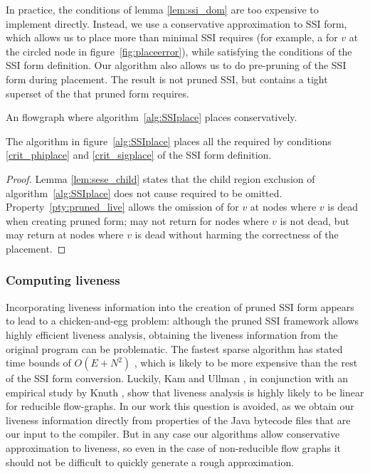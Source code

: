 \documentclass[12pt,titlepage,twoside]{article}
\newcommand*{\figscale}{1.0}
\begin{document}
In practice, the conditions of lemma \ref{lem:ssi_dom} are too expensive
to implement directly.  Instead, we use a conservative approximation
to SSI form, which allows us to place more  than
minimal SSI requires (for example, a \phifunction for $v$ at the
circled node in figure~\ref{fig:placeerror}), while satisfying the
conditions of the SSI form definition.  
Our algorithm also allows us to do pre-pruning of the SSI
form during placement.  The result is not pruned SSI, but contains a
tight superset of the  that pruned form requires.
\begin{myfigure}
\centering\renewcommand*{\figscale}{0.30}
\caption{An flowgraph where algorithm~\ref{alg:SSIplace} places
 conservatively.}\label{fig:placeerror}
\end{myfigure}

\begin{theorem}\label{thm:placeproof}
The algorithm in figure~\ref{alg:SSIplace} places all the
 required by conditions \ref{crit_phiplace} and
\ref{crit_sigplace} of the SSI form definition.
\end{theorem}
\begin{proof}
Lemma \ref{lem:sese_child} states that the child region exclusion of
algorithm~\ref{alg:SSIplace} does not cause required  to
be omitted.  Property~\ref{pty:pruned_live} allows the omission of
 for $v$ at nodes where $v$ is dead when creating
pruned form;  may not return  for nodes
where $v$ is not dead, but may return  at nodes where $v$
is dead without harming the correctness of the \phisigfunction{}
placement.
\end{proof}

\subsubsection{Computing liveness}
Incorporating liveness information into the creation of pruned SSI
form appears to lead to a chicken-and-egg problem: although the pruned
SSI framework allows highly efficient liveness analysis, obtaining the
liveness information from the original program can be problematic.
The fastest sparse algorithm has stated time bounds of $O(E+N^2)$
\cite{ferrante91:pruned}, which is likely to be more expensive than
the rest of the SSI form conversion.  Luckily, Kam and Ullman
\cite{kam76:dataflow}, in conjunction with an empirical study by Knuth
\cite{knuth74:fortran}, show that liveness analysis is highly likely
to be linear for reducible flow-graphs.  In our work this question is
avoided, as we obtain our liveness information directly from
properties of the Java bytecode files that are our input to the
compiler.  But in any case our algorithms allow conservative
approximation to liveness, so even in the case of non-reducible flow
graphs it should not be difficult to quickly generate a rough
approximation.
\end{document}
